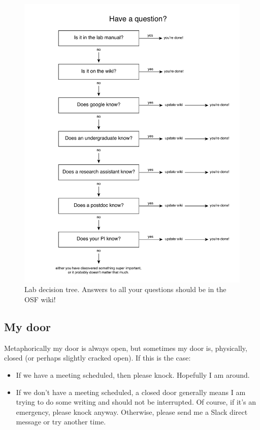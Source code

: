 \documentclass[letterpaper,12pt,oneside]{memoir}
\begin{document}
\begin{figure}
\label{fig:decisiontree}
\includegraphics[width=\textwidth]{figures/lab_decision_tree.pdf}
\caption{Lab decision tree. Answers to all your questions should be in the OSF wiki!}
\end{figure}

\subsection{My door}
Metaphorically my door is always open, but sometimes my door is, physically, closed (or perhaps slightly cracked open). If this is the case:

\begin{itemize}
\item If we have a meeting scheduled, then please knock. Hopefully I am around.

\item If we don't have a meeting scheduled, a closed door generally means I am trying to do some writing and should not be interrupted. Of course, if it's an emergency, please knock anyway. Otherwise, please send me a Slack direct message or try another time.
\end{itemize}
\end{document}
